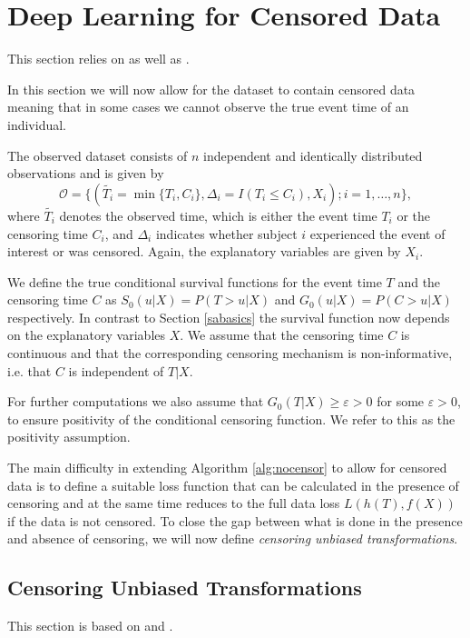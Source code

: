 \documentclass[12pt, a4paper]{scrartcl}
\theoremstyle{definition}
\theoremstyle{plain}
\numberwithin{equation}{section}
\numberwithin{figure}{section}
\numberwithin{table}{section}
\begin{document}
	\newpage
	\section{Deep Learning for Censored Data} \label{censored}
	
	This section relies on \citet*{basearticle} as well as \citet*{deeplbook}.
	
	In this section we will now allow for the dataset to contain censored data meaning that in some cases we cannot observe the true event time of an individual.
	
	The observed dataset consists of $n$ independent and identically distributed observations and is given by
	$$\mathcal{O} = \{(\tilde{T_i} = \min \{T_i, C_i\}, \Delta_i = I(T_i \leq C_i), X_i); i = 1,\dots,n\},$$
	 where $\tilde{T_i}$ denotes the observed time, which is either the event time $T_i$ or the censoring time $C_i$, and $\Delta_i$ indicates whether subject $i$ experienced the event of interest or was censored.
	 Again, the explanatory variables are given by $X_i$.
	 
	 We define the true conditional survival functions for the event time $T$ and the censoring time $C$ as $S_0(u \vert X)=P(T>u \vert X)$ and $G_0(u \vert X)=P(C>u \vert X)$ respectively.
	 In contrast to Section \ref{sabasics} the survival function now depends on the explanatory variables $X$.
	 We assume that the censoring time $C$ is continuous and that the corresponding censoring mechanism is non-informative, i.e. that $C$ is independent of $T\vert X$.
	 
	 For further computations we also assume that $G_0(T \vert X)\geq \varepsilon > 0$ for some $\varepsilon >0$, to ensure positivity of the conditional censoring function.
	 We refer to this as the positivity assumption.
	
	The main difficulty in extending Algorithm \ref{alg:nocensor} to allow for censored data is to define a suitable loss function that can be calculated in the presence of censoring and at the same time reduces to the full data loss $L(h(T), f(X))$ if the data is not censored.
	To close the gap between what is done in the presence and absence of censoring, we will now define \textit{censoring unbiased transformations}.
	
	\subsection{Censoring Unbiased Transformations}\label{sec:drtrafo}
	This section is based on \citet*{culs} and \citet*{drcut}.
	
\end{document}

